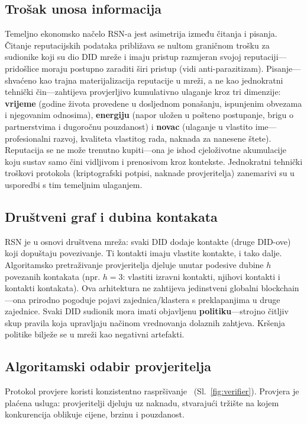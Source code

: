 \documentclass[11pt,a4paper,twocolumn]{article}
\begin{document}
\subsection{Trošak unosa informacija}

Temeljno ekonomsko načelo RSN-a jest asimetrija između čitanja i pisanja. Čitanje reputacijskih podataka približava se nultom graničnom trošku za sudionike koji su dio DID mreže i imaju pristup razmjeran svojoj reputaciji---pridošlice moraju postupno zaraditi širi pristup (vidi anti-parazitizam). Pisanje---shvaćeno kao trajna materijalizacija reputacije u mreži, a ne kao jednokratni tehnički čin---zahtijeva provjerljivo kumulativno ulaganje kroz tri dimenzije: \textbf{vrijeme} (godine života provedene u dosljednom ponašanju, ispunjenim obvezama i njegovanim odnosima), \textbf{energiju} (napor uložen u pošteno postupanje, brigu o partnerstvima i dugoročnu pouzdanost) i \textbf{novac} (ulaganje u vlastito ime---profesionalni razvoj, kvaliteta vlastitog rada, naknada za nanesene štete). Reputacija se ne može trenutno kupiti---ona je ishod cjeloživotne akumulacije koju sustav samo čini vidljivom i prenosivom kroz kontekste. Jednokratni tehnički troškovi protokola (kriptografski potpisi, naknade provjeritelja) zanemarivi su u usporedbi s tim temeljnim ulaganjem.

\subsection{Društveni graf i dubina kontakata}

RSN je u osnovi društvena mreža: svaki DID dodaje kontakte (druge DID-ove) koji dopuštaju povezivanje. Ti kontakti imaju vlastite kontakte, i tako dalje. Algoritamsko pretraživanje provjeritelja djeluje unutar podesive dubine $h$ povezanih kontakata (npr. $h=3$: vlastiti izravni kontakti, njihovi kontakti i kontakti kontakata). Ova arhitektura ne zahtijeva jedinstveni globalni blockchain---ona prirodno pogoduje pojavi zajednica/klastera s preklapanjima u druge zajednice. Svaki DID sudionik mora imati objavljenu \textbf{politiku}---strojno čitljiv skup pravila koja upravljaju načinom vrednovanja dolaznih zahtjeva. Kršenja politike bilježe se u mreži kao negativni artefakti.

\subsection{Algoritamski odabir provjeritelja}

Protokol provjere koristi konzistentno raspršivanje~\cite{karger1997} (Sl.~\ref{fig:verifier}). Provjera je plaćena usluga: provjeritelji djeluju uz naknadu, stvarajući tržište na kojem konkurencija oblikuje cijene, brzinu i pouzdanost.
\end{document}
